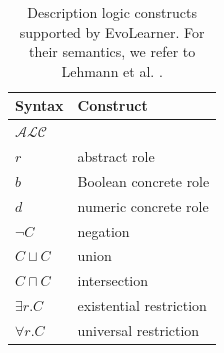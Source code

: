 \makeatletter
\newcommand\setarraystretch[1]{%
  \noalign{\ifnum0=`}\fi
  \gdef\arraystretch{#1}%
  \global\setbox\@arstrutbox\hbox{%
    \vrule \@height\arraystretch\ht\strutbox%
    \@depth\arraystretch \dp\strutbox%
    \@width\z@}%
  \ifnum0=`{\fi}%
}
\makeatother

\begin{table}[tb]
  \centering
  \caption{Description logic constructs supported by Evo\-Learn\-er. For their semantics, we refer to Lehmann et al. \cite{Lehmann2010Concept}.}%
  \label{tab:description-logics}
  \footnotesize
  \setlength{\tabcolsep}{6pt}
  \renewcommand{\arraystretch}{1.15}
  \begin{tabular}{@{}ll@{}}
  \toprule
  \textbf{Syntax} & \textbf{Construct} \\
  \midrule
  $\mathcal{ALC}$ \\
  \midrule
  $r$           & abstract role           \\
  $b$           & Boolean concrete role   \\
  $d$           & numeric concrete role    \\[6pt]
  $\neg C$      & negation                \\
  $C \sqcup C$  & union                   \\
  $C \sqcap C$  & intersection            \\
  $\exists r.C$ & existential restriction \\
  $\forall r.C$ & universal restriction   \\
  \bottomrule
  \end{tabular}\hfill
\end{table}